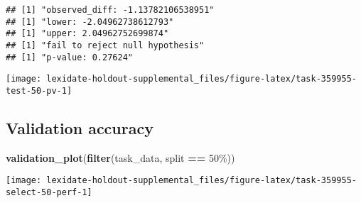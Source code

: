 \documentclass[
]{book}
\newenvironment{Shaded}{\begin{snugshade}}{\end{snugshade}}
\newcommand{\AttributeTok}[1]{\textcolor[rgb]{0.13,0.29,0.53}{#1}}
\newcommand{\DecValTok}[1]{\textcolor[rgb]{0.00,0.00,0.81}{#1}}
\newcommand{\FunctionTok}[1]{\textcolor[rgb]{0.13,0.29,0.53}{\textbf{#1}}}
\newcommand{\NormalTok}[1]{#1}
\newcommand{\OtherTok}[1]{\textcolor[rgb]{0.56,0.35,0.01}{#1}}
\newcommand{\SpecialCharTok}[1]{\textcolor[rgb]{0.81,0.36,0.00}{\textbf{#1}}}
\newcommand{\StringTok}[1]{\textcolor[rgb]{0.31,0.60,0.02}{#1}}
\begin{document}
\begin{Shaded}
\end{Shaded}

\begin{verbatim}
## [1] "observed_diff: -1.13782106538951"
## [1] "lower: -2.04962738612793"
## [1] "upper: 2.04962752699874"
## [1] "fail to reject null hypothesis"
## [1] "p-value: 0.27624"
\end{verbatim}

\texttt{[image: lexidate-holdout-supplemental\_files/figure-latex/task-359955-test-50-pv-1]}

\hypertarget{validation-accuracy-12}{%
\subsection{Validation accuracy}\label{validation-accuracy-12}}

\begin{Shaded}
\begin{Highlighting}[]
\FunctionTok{validation\_plot}\NormalTok{(}\FunctionTok{filter}\NormalTok{(task\_data, split }\SpecialCharTok{==} \StringTok{\textquotesingle{}50\%\textquotesingle{}}\NormalTok{))}
\end{Highlighting}
\end{Shaded}

\texttt{[image: lexidate-holdout-supplemental\_files/figure-latex/task-359955-select-50-perf-1]}
\end{document}
